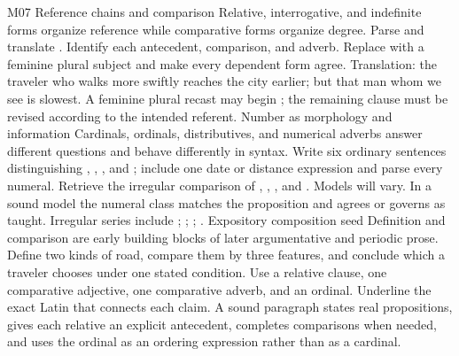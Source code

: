 \begin{courseunit}{M07}
\SubmoduleExtension
  {Reference chains and comparison}
  {Relative, interrogative, and indefinite forms organize reference while
  comparative forms organize degree.}
  {Parse and translate .  Identify each antecedent,
  comparison, and adverb.}
  {Replace  with a feminine plural subject and make every
  dependent form agree.}
  {Translation: the traveler who walks more swiftly reaches the city earlier;
  but that man whom we see is slowest.  A feminine plural recast may begin
  ; the remaining clause must be
  revised according to the intended referent.}
\SubmoduleExtension
  {Number as morphology and information}
  {Cardinals, ordinals, distributives, and numerical adverbs answer different
  questions and behave differently in syntax.}
  {Write six ordinary sentences distinguishing , , , and ; include one date or
  distance expression and parse every numeral.}
  {Retrieve the irregular comparison of , ,
  , and .}
  {Models will vary.  In a sound model the numeral class matches the
  proposition and agrees or governs as taught.  Irregular series include
  ; ;
  ; .}
\SubmoduleExtension
  {Expository composition seed}
  {Definition and comparison are early building blocks of later argumentative
  and periodic prose.}
  {Define two kinds of road, compare them by three features, and conclude
  which a traveler chooses under one stated condition.  Use a relative clause,
  one comparative adjective, one comparative adverb, and an ordinal.}
  {Underline the exact Latin that connects each claim.}
  {A sound paragraph states real propositions, gives each relative an explicit
  antecedent, completes comparisons when needed, and uses the ordinal as an
  ordering expression rather than as a cardinal.}
\end{courseunit}

